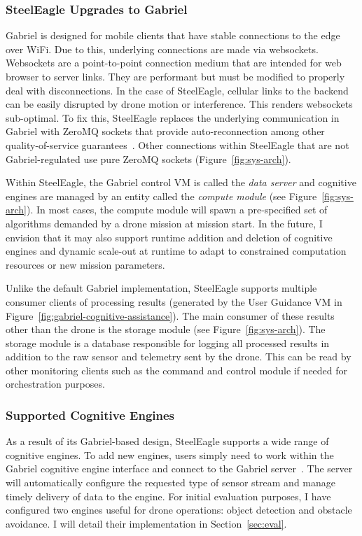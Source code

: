 \subsubsection{SteelEagle Upgrades to Gabriel}
Gabriel is designed for mobile clients that have stable connections to the edge over WiFi. Due to this, underlying connections are made via websockets. Websockets are a point-to-point connection medium that are intended for web browser to server links. They are performant but must be modified to properly deal with disconnections. In the case of SteelEagle,  cellular links to the backend can be easily disrupted by drone motion or interference. This renders websockets sub-optimal. To fix this, SteelEagle replaces the underlying communication in Gabriel with ZeroMQ sockets that provide auto-reconnection among other quality-of-service guarantees~\cite{ZeroMQ}. Other connections within SteelEagle that are not Gabriel-regulated use pure ZeroMQ sockets (Figure~\ref{fig:sys-arch}).

Within SteelEagle, the Gabriel control VM is called the \textit{data server} and cognitive engines are managed by an entity called the \textit{compute module} (see Figure~\ref{fig:sys-arch}). In most cases, the compute module will spawn a pre-specified set of algorithms demanded by a drone mission at mission start. In the future, I envision that it may also support runtime addition and deletion of cognitive engines and dynamic scale-out at runtime to adapt to constrained computation resources or new mission parameters.

Unlike the default Gabriel implementation, SteelEagle supports multiple consumer clients of processing results (generated by the User Guidance VM in Figure~\ref{fig:gabriel-cognitive-assistance}). The main consumer of these results other than the drone is the storage module (see Figure~\ref{fig:sys-arch}). The storage module is a database responsible for logging all processed results in addition to the raw sensor and telemetry sent by the drone. This can be read by other monitoring clients such as the command and control module if needed for orchestration purposes.

\subsubsection{Supported Cognitive Engines}
As a result of its Gabriel-based design, SteelEagle supports a wide range of cognitive engines. To add new engines, users simply need to work within the Gabriel cognitive engine interface and connect to the Gabriel server~\cite{Ha2014}. The server will automatically configure the requested type of sensor stream and manage timely delivery of data to the engine. For initial evaluation purposes, I have configured two engines useful for drone operations: object detection and obstacle avoidance. I will detail their implementation in Section~\ref{sec:eval}.

